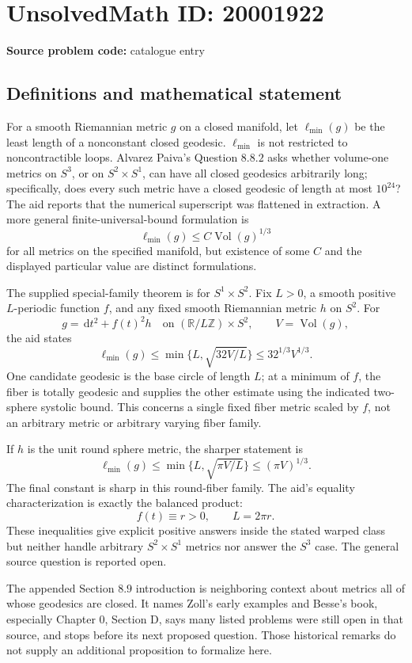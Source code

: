\documentclass[11pt]{article}
\newcommand{\Z}{\mathbb{Z}}
\newcommand{\R}{\mathbb{R}}
\newcommand{\dd}{\,\mathrm{d}}
\begin{document}
\section*{UnsolvedMath ID: 20001922}
\textbf{Source problem code:} catalogue entry
\subsection{Definitions and mathematical statement}
For a smooth Riemannian metric \(g\) on a closed manifold, let \(\ell_{\min}(g)\) be the least length of a nonconstant closed geodesic. \(\ell_{\min}\) is not restricted to noncontractible loops. Alvarez Paiva's Question \(8.8.2\) asks whether volume-one metrics on \(S^3\), or on \(S^2\times S^1\), can have all closed geodesics arbitrarily long; specifically, does every such metric have a closed geodesic of length at most \(10^{24}\)? The aid reports that the numerical superscript was flattened in extraction. A more general finite-universal-bound formulation is
\[
 \ell_{\min}(g)\leq C\operatorname{Vol}(g)^{1/3}
\]
for all metrics on the specified manifold, but existence of some \(C\) and the displayed particular value are distinct formulations.

The supplied special-family theorem is for \(S^1\times S^2\). Fix \(L>0\), a smooth positive \(L\)-periodic function \(f\), and any fixed smooth Riemannian metric \(h\) on \(S^2\). For
\[
 g=\dd t^2+f(t)^2h\quad\text{on }(\R/L\Z)\times S^2,
 \qquad V=\operatorname{Vol}(g),
\]
the aid states
\[
 \ell_{\min}(g)\leq\min\{L,\sqrt{32V/L}\}
             \leq32^{1/3}V^{1/3}.
\]
One candidate geodesic is the base circle of length \(L\); at a minimum of \(f\), the fiber is totally geodesic and supplies the other estimate using the indicated two-sphere systolic bound. This concerns a single fixed fiber metric scaled by \(f\), not an arbitrary metric or arbitrary varying fiber family.

If \(h\) is the unit round sphere metric, the sharper statement is
\[
 \ell_{\min}(g)\leq\min\{L,\sqrt{\pi V/L}\}
             \leq(\pi V)^{1/3}.
\]
The final constant is sharp in this round-fiber family. The aid's equality characterization is exactly the balanced product:
\[
 f(t)\equiv r>0,\qquad L=2\pi r.
\]
These inequalities give explicit positive answers inside the stated warped class but neither handle arbitrary \(S^2\times S^1\) metrics nor answer the \(S^3\) case. The general source question is reported open.

The appended Section \(8.9\) introduction is neighboring context about metrics all of whose geodesics are closed. It names Zoll's early examples and Besse's book, especially Chapter \(0\), Section D, says many listed problems were still open in that source, and stops before its next proposed question. Those historical remarks do not supply an additional proposition to formalize here.
\end{document}
